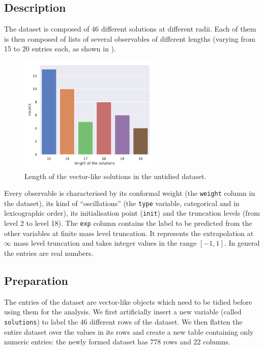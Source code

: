 \subsection{Description}

The dataset is composed of 46 different solutions at different radii.
Each of them is then composed of lists of several observables of different lengths (varying from 15 to 20 entries each, as shown in ).

\begin{figure}[htbp]
  \centering
  \includegraphics[width=0.6\textwidth]{img/sol_length}
  \caption{Length of the vector-like solutions in the untidied dataset.}
  \label{fig:lumps:length}
\end{figure}

Every observable is characterised by its conformal weight (the \texttt{weight} column in the dataset), its kind of ``oscillations'' (the \texttt{type} variable, categorical and in lexicographic order), its initialisation point (\texttt{init}) and the truncation levels (from level 2 to level 18).
The \texttt{exp} column contains the label to be predicted from the other variables at finite mass level truncation.
It represents the extrapolation at $\infty$ mass level truncation and takes integer values in the range $[-1, 1]$.
In general the entries are real numbers.


\subsection{Preparation}

The entries of the dataset are vector-like objects which need to be tidied before using them for the analysis.
We first artificially insert a new variable (called \texttt{solutions}) to label the 46 different rows of the dataset.
We then flatten the entire dataset over the values in its rows and create a new table containing only numeric entries: the newly formed dataset has 778 rows and 22 columns.

